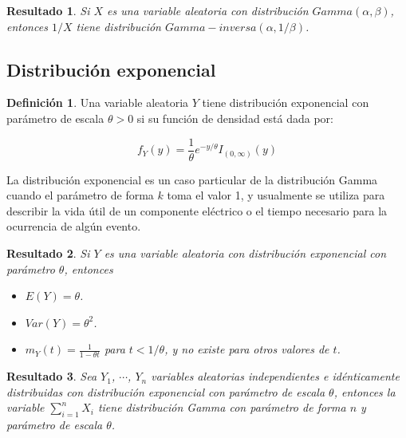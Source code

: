 \documentclass[
  10pt,
  spanish,
]{book}
\providecommand{\tightlist}{%
  \setlength{\itemsep}{0pt}\setlength{\parskip}{0pt}}
\newtheorem{proposition}{Resultado}[chapter]
\theoremstyle{definition}
\newtheorem{definition}{Definición}[chapter]
\theoremstyle{definition}
\theoremstyle{definition}
\theoremstyle{definition}
\theoremstyle{remark}
\begin{document}
\begin{proposition}
\protect\hypertarget{prp:gammainver}{}{\label{prp:gammainver} }Si \(X\) es una variable aleatoria con distribución \(Gamma(\alpha,\beta)\), entonces \(1/X\) tiene distribución \(Gamma-inversa(\alpha,1/\beta)\).
\end{proposition}

\hypertarget{distribuciuxf3n-exponencial}{%
\subsection{Distribución exponencial}\label{distribuciuxf3n-exponencial}}

\begin{definition}
\protect\hypertarget{def:unnamed-chunk-27}{}{\label{def:unnamed-chunk-27} }Una variable aleatoria \(Y\) tiene distribución exponencial con parámetro de escala \(\theta>0\) si su función de densidad está dada por:

\begin{equation}
f_Y(y)=\frac{1}{\theta}e^{-y/\theta}I_{(0,\infty)}(y)
\end{equation}
\end{definition}

La distribución exponencial es un caso particular de la distribución Gamma cuando el parámetro de forma \(k\) toma el valor 1, y usualmente se utiliza para describir la vida útil de un componente eléctrico o el tiempo necesario para la ocurrencia de algún evento.

\begin{proposition}
\protect\hypertarget{prp:unnamed-chunk-28}{}{\label{prp:unnamed-chunk-28} }Si \(Y\) es una variable aleatoria con distribución exponencial con parámetro \(\theta\), entonces

\begin{itemize}
\tightlist
\item
  \(E(Y)=\theta\).
\item
  \(Var(Y)=\theta^2\).
\item
  \(m_Y(t)=\frac{1}{1-\theta t}\) para \(t<1/\theta\), y no existe para otros valores de \(t\).
\end{itemize}
\end{proposition}

\begin{proposition}
\protect\hypertarget{prp:unnamed-chunk-29}{}{\label{prp:unnamed-chunk-29} }Sea \(Y_1\), \(\cdots\), \(Y_n\) variables aleatorias independientes e idénticamente distribuidas con distribución exponencial con parámetro de escala \(\theta\), entonces la variable \(\sum_{i=1}^nX_i\) tiene distribución Gamma con parámetro de forma \(n\) y parámetro de escala \(\theta\).
\end{proposition}
\end{document}
